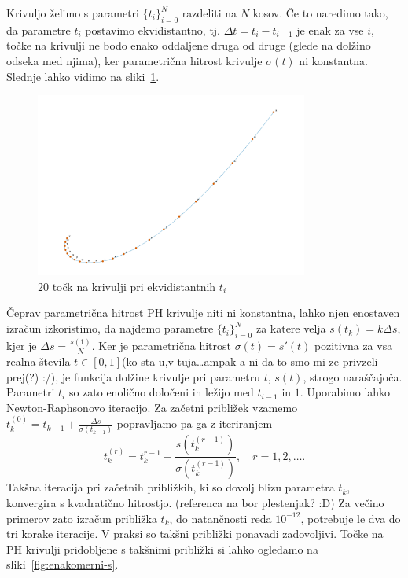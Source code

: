 \documentclass[isrm2, tisk]{fmfdelo}
\begin{document}
    Krivuljo želimo s parametri $\{t_i\}_{i=0}^{N}$ razdeliti na $N$ kosov.
    Če to naredimo tako, da parametre $t_i$ postavimo ekvidistantno, tj. $\Delta t=t_i-t_{i-1}$ je enak za vse $i$, točke na krivulji ne bodo enako oddaljene druga od druge (glede na dolžino odseka med njima), ker parametrična hitrost krivulje $\sigma(t)$ ni konstantna.
    Slednje lahko vidimo na sliki~\ref{fig:enakomerni-t}.
    \begin{figure}[h]
        \centering
        \includegraphics[width = 0.80\textwidth]{images/enakomerni-t}
        \caption{20 točk na krivulji pri ekvidistantnih $t_i$}
        \label{fig:enakomerni-t}
    \end{figure}
    Čeprav parametrična hitrost PH krivulje niti ni konstantna, lahko njen enostaven izračun izkoristimo, da najdemo parametre $\{t_i\}^{N}_{i=0}$  za katere velja $s(t_k)=k\Delta s$, kjer je $\Delta s = \frac{s(1)}{N}$.
    Ker je parametrična hitrost $\sigma(t)=s'(t)$ pozitivna za vsa realna števila $t\in[0,1]$(ko sta u,v tuja\ldots ampak a ni da to smo mi ze privzeli prej(?) :/),
    je funkcija dolžine krivulje pri parametru $t$, $s(t)$, strogo naraščajoča.
    Parametri $t_i$ so zato enolično določeni in ležijo med $t_{i-1}$ in $1$.
    Uporabimo lahko Newton-Raphsonovo iteracijo.
    Za začetni približek vzamemo $t_k^{(0)} = t_{k-1} + \frac{\Delta s}{\sigma(t_{k-1})}$ popravljamo pa ga z iteriranjem
    \[ t_k^{(r)} = t_k^{r-1} - \frac{s(t_k^{(r-1)})}{\sigma(t_k^{(r-1)})}, \quad r=1,2,\ldots .\]
    Takšna iteracija pri začetnih približkih, ki so dovolj blizu parametra $t_k$, konvergira s kvadratično hitrostjo. (referenca na bor plestenjak? :D)
    Za večino primerov zato izračun približka $t_k$, do natančnosti reda $10^{-12}$, potrebuje le dva do tri korake iteracije.
    V praksi so takšni približki ponavadi zadovoljivi.
    Točke na PH krivulji pridobljene s takšnimi približki si lahko ogledamo na sliki~\ref{fig:enakomerni-s}.
\end{document}
